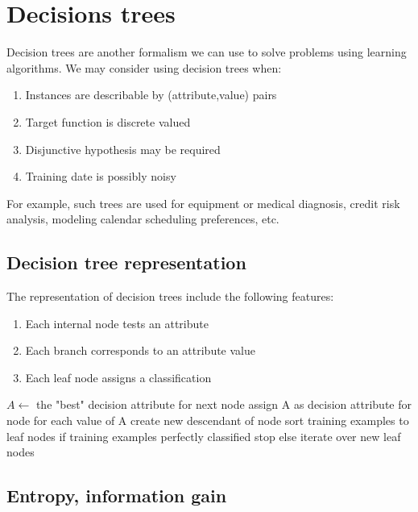 \chapter{Decisions trees}
Decision trees are another formalism we can use to solve problems using learning algorithms. We may consider using decision trees when:
\begin{enumerate}
    \item Instances are describable by (attribute,value) pairs
    \item Target function is discrete valued
    \item Disjunctive hypothesis may be required
    \item Training date is possibly noisy
\end{enumerate}
For example, such trees are used for equipment or medical diagnosis, credit risk analysis, modeling calendar scheduling preferences, etc.

\section{Decision tree representation}
The representation of decision trees include the following features:
\begin{enumerate}
    \item Each internal node tests an attribute
    \item Each branch corresponds to an attribute value
    \item Each leaf node assigns a classification
\end{enumerate}

\begin{algorithm}[caption={Top-down induction of decision trees  (main loop).}, label={alg10}]
$A \leftarrow$ the "best" decision attribute for next node
assign A as decision attribute for node
for each value of A 
    create new descendant of node
sort training examples to leaf nodes
if training examples perfectly classified
    stop
else
    iterate over new leaf nodes
\end{algorithm}

\section{Entropy, information gain}
